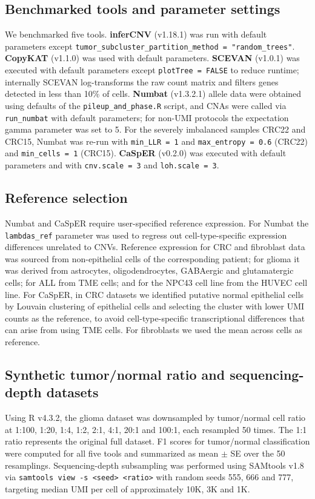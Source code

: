 \documentclass[11pt]{article}
\begin{document}
\subsection{Benchmarked tools and parameter settings}
We benchmarked five tools. \textbf{inferCNV} (v1.18.1) \citep{infercnv2018} was run with default parameters except \texttt{tumor\_subcluster\_partition\_method = "random\_trees"}. \textbf{CopyKAT} (v1.1.0) \citep{gao2021copykat} was used with default parameters. \textbf{SCEVAN} (v1.0.1) \citep{defalco2023scevan} was executed with default parameters except \texttt{plotTree = FALSE} to reduce runtime; internally SCEVAN log-transforms the raw count matrix and filters genes detected in less than 10\% of cells. \textbf{Numbat} (v1.3.2.1) \citep{gao2022numbat} allele data were obtained using defaults of the \texttt{pileup\_and\_phase.R} script, and CNAs were called via \texttt{run\_numbat} with default parameters; for non-UMI protocols the expectation gamma parameter was set to 5. For the severely imbalanced samples CRC22 and CRC15, Numbat was re-run with \texttt{min\_LLR = 1} and \texttt{max\_entropy = 0.6} (CRC22) and \texttt{min\_cells = 1} (CRC15). \textbf{CaSpER} (v0.2.0) \citep{serin2020casper} was executed with default parameters and with \texttt{cnv.scale = 3} and \texttt{loh.scale = 3}.

\subsection{Reference selection}
Numbat and CaSpER require user-specified reference expression. For Numbat the \texttt{lambdas\_ref} parameter was used to regress out cell-type-specific expression differences unrelated to CNVs. Reference expression for CRC and fibroblast data was sourced from non-epithelial cells of the corresponding patient; for glioma it was derived from astrocytes, oligodendrocytes, GABAergic and glutamatergic cells; for ALL from TME cells; and for the NPC43 cell line from the HUVEC cell line. For CaSpER, in CRC datasets we identified putative normal epithelial cells by Louvain clustering of epithelial cells and selecting the cluster with lower UMI counts as the reference, to avoid cell-type-specific transcriptional differences that can arise from using TME cells. For fibroblasts we used the mean across cells as reference.

\subsection{Synthetic tumor/normal ratio and sequencing-depth datasets}
Using R v4.3.2, the glioma dataset was downsampled by tumor/normal cell ratio at 1:100, 1:20, 1:4, 1:2, 2:1, 4:1, 20:1 and 100:1, each resampled 50 times. The 1:1 ratio represents the original full dataset. F1 scores for tumor/normal classification were computed for all five tools and summarized as mean $\pm$ SE over the 50 resamplings. Sequencing-depth subsampling was performed using SAMtools v1.8 \citep{li2009samtools} via \texttt{samtools view -s <seed> <ratio>} with random seeds 555, 666 and 777, targeting median UMI per cell of approximately 10K, 3K and 1K.
\end{document}
